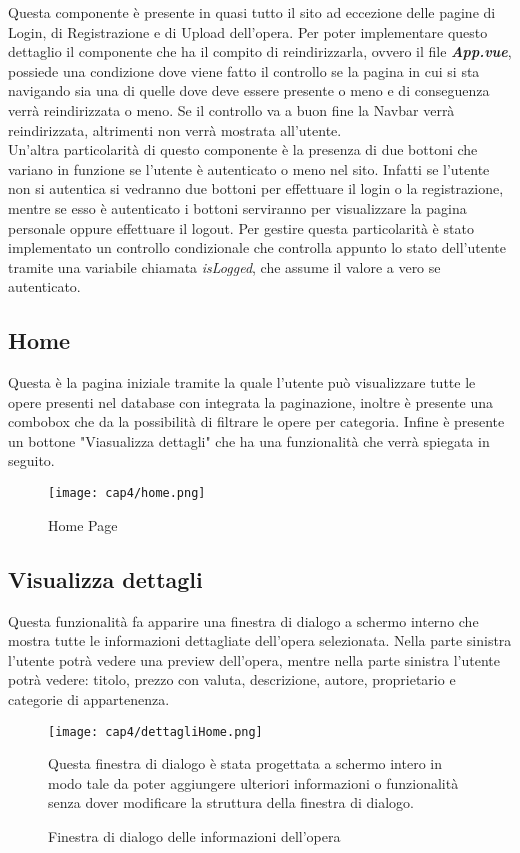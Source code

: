 Questa componente è presente in quasi tutto il sito ad eccezione delle pagine di Login, di Registrazione e di Upload dell'opera. Per poter implementare questo dettaglio il componente che ha il compito di reindirizzarla, ovvero il file \textbf{\textit{App.vue}}, possiede una condizione dove viene fatto il controllo se la pagina in cui si sta navigando sia una di quelle dove deve essere presente o meno e di conseguenza verrà reindirizzata o meno. Se il controllo va a buon fine la Navbar verrà reindirizzata, altrimenti non verrà mostrata all'utente.\\
Un'altra particolarità di questo componente è la presenza di due bottoni che variano in funzione se l'utente è autenticato o meno nel sito. Infatti se l'utente non si autentica si vedranno due bottoni per effettuare il login o la registrazione, mentre se esso è autenticato i bottoni serviranno per visualizzare la pagina personale oppure effettuare il logout. Per gestire questa particolarità è stato implementato un controllo condizionale che controlla appunto lo stato dell'utente tramite una variabile chiamata \textit{isLogged}, che assume il valore a vero se autenticato.

\subsection{Home}
\label{subsec:home}

Questa è la pagina iniziale tramite la quale l'utente può visualizzare tutte le opere presenti nel database con integrata la paginazione, inoltre è presente una combobox che da la possibilità di filtrare le opere per categoria. Infine è presente un bottone "Viasualizza dettagli" che ha una funzionalità che verrà spiegata in seguito.
\begin{figure}[H]
	\begin{center}
		\texttt{[image: cap4/home.png]}
		\caption{Home Page}
	\end{center}
\end{figure}

\subsection{Visualizza dettagli}
\label{subsec:visualizza-dettagli}

Questa funzionalità fa apparire una finestra di dialogo a schermo interno che mostra tutte le informazioni dettagliate dell'opera selezionata. Nella parte sinistra l'utente potrà vedere una preview dell'opera, mentre nella parte sinistra l'utente potrà vedere: titolo, prezzo con valuta, descrizione, autore, proprietario e categorie di appartenenza.
\begin{figure}[H]
	\begin{center}
		\texttt{[image: cap4/dettagliHome.png]}
		\caption{Finestra di dialogo delle informazioni dell'opera}
	\end{center}
Questa finestra di dialogo è stata progettata a schermo intero in modo tale da poter aggiungere ulteriori informazioni o funzionalità senza dover modificare la struttura della finestra di dialogo.
\end{figure}

